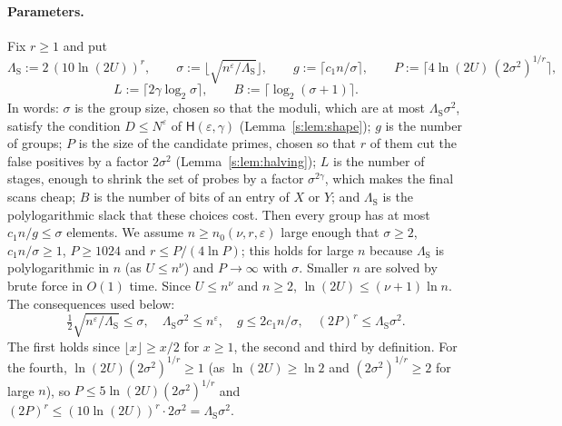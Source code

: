 \documentclass[11pt]{article}
\theoremstyle{definition}
\theoremstyle{remark}
\newcommand{\Hyp}{\mathsf{H}}
\begin{document}
\paragraph{Parameters.} Fix $r\ge1$ and put
\[
\Lambda_{\mathrm S}:=2\,(10\ln(2U))^r,\qquad
\sigma:=\big\lfloor\sqrt{n^\varepsilon/\Lambda_{\mathrm S}}\big\rfloor,\qquad
g:=\lceil c_1n/\sigma\rceil,\qquad
P:=\big\lceil4\ln(2U)\,(2\sigma^2)^{1/r}\big\rceil,
\]
\[
L:=\lceil2\gamma\log_2\sigma\rceil,\qquad B:=\lceil\log_2(\sigma+1)\rceil .
\]
In words: $\sigma$ is the group size, chosen so that the moduli, which are at most $\Lambda_{\mathrm S}\sigma^2$, satisfy the condition $D\le N^\varepsilon$ of $\Hyp(\varepsilon,\gamma)$ (Lemma~\ref{s:lem:shape}); $g$ is the number of groups; $P$ is the size of the candidate primes, chosen so that $r$ of them cut the false positives by a factor $2\sigma^2$ (Lemma~\ref{s:lem:halving}); $L$ is the number of stages, enough to shrink the set of probes by a factor $\sigma^{2\gamma}$, which makes the final scans cheap; $B$ is the number of bits of an entry of $X$ or $Y$; and $\Lambda_{\mathrm S}$ is the polylogarithmic slack that these choices cost. Then every group has at most $c_1n/g\le\sigma$ elements. We assume $n\ge n_0(\nu,r,\varepsilon)$ large enough that $\sigma\ge2$, $c_1n/\sigma\ge1$, $P\ge1024$ and $r\le P/(4\ln P)$; this holds for large $n$ because $\Lambda_{\mathrm S}$ is polylogarithmic in $n$ (as $U\le n^\nu$) and $P\to\infty$ with $\sigma$. Smaller $n$ are solved by brute force in $O(1)$ time. Since $U\le n^\nu$ and $n\ge2$, $\ln(2U)\le(\nu+1)\ln n$. The consequences used below:
\begin{equation}\label{s:eq:params}
\tfrac12\sqrt{n^\varepsilon/\Lambda_{\mathrm S}}\le\sigma,\quad \Lambda_{\mathrm S}\sigma^2\le n^\varepsilon,\quad g\le 2c_1n/\sigma,\quad (2P)^r\le\Lambda_{\mathrm S}\sigma^2 .
\end{equation}
The first holds since $\lfloor x\rfloor\ge x/2$ for $x\ge1$, the second and third by definition. For the fourth, $\ln(2U)(2\sigma^2)^{1/r}\ge1$ (as $\ln(2U)\ge\ln2$ and $(2\sigma^2)^{1/r}\ge2$ for large $n$), so $P\le5\ln(2U)(2\sigma^2)^{1/r}$ and $(2P)^r\le(10\ln(2U))^r\cdot2\sigma^2=\Lambda_{\mathrm S}\sigma^2$.
\end{document}
